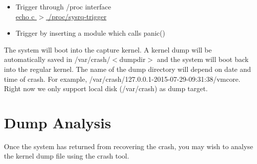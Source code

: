 \documentclass{article}
\begin{document}
\begin{itemize}
\item Trigger through /proc interface\\

 \underline{echo c $>$ /proc/sysrq-trigger}\\
\begin{figure}[H]        
\end{figure}

\item Trigger by inserting a module which calls panic()\\
\end{itemize}
\noindent
The system will boot into the capture kernel. A kernel dump will be
automatically saved in /var/crash/$<$dumpdir$>$ and the system will boot back
into the regular kernel. The name of the dump directory will depend on date and
time of crash. For example, /var/crash/127.0.0.1-2015-07-29-09:31:38/vmcore.
Right now we only support local disk (/var/crash) as dump target.\\
\begin{figure}[H]        
\end{figure}
\section{Dump Analysis}

\noindent
Once the system has returned from recovering the crash, you may wish to analyse
the kernel dump file using the crash tool.\\
\end{document}
